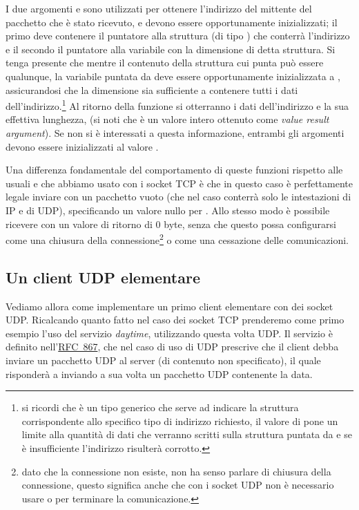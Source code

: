 I due argomenti  e  sono utilizzati per ottenere
l'indirizzo del mittente del pacchetto che è stato ricevuto, e devono essere
opportunamente inizializzati; il primo deve contenere il puntatore alla
struttura (di tipo ) che conterrà l'indirizzo e il secondo il
puntatore alla variabile con la dimensione di detta struttura. Si tenga
presente che mentre il contenuto della struttura  cui punta
 può essere qualunque, la variabile puntata da 
deve essere opportunamente inizializzata a ,
assicurandosi che la dimensione sia sufficiente a contenere tutti i dati
dell'indirizzo.\footnote{si ricordi che  è un tipo generico che
  serve ad indicare la struttura corrispondente allo specifico tipo di
  indirizzo richiesto, il valore di  pone un limite alla
  quantità di dati che verranno scritti sulla struttura puntata da
   e se è insufficiente l'indirizzo risulterà corrotto.}  Al
ritorno della funzione si otterranno i dati dell'indirizzo e la sua effettiva
lunghezza, (si noti che  è un valore intero ottenuto come
\textit{value result argument}).  Se non si è interessati a questa
informazione, entrambi gli argomenti devono essere inizializzati al valore
.

Una differenza fondamentale del comportamento di queste funzioni rispetto alle
usuali  e  che abbiamo usato con i socket TCP è che in
questo caso è perfettamente legale inviare con  un pacchetto
vuoto (che nel caso conterrà solo le intestazioni di IP e di UDP),
specificando un valore nullo per . Allo stesso modo è possibile
ricevere con  un valore di ritorno di 0 byte, senza che questo
possa configurarsi come una chiusura della connessione\footnote{dato che la
  connessione non esiste, non ha senso parlare di chiusura della connessione,
  questo significa anche che con i socket UDP non è necessario usare
   o  per terminare la comunicazione.} o come una
cessazione delle comunicazioni.



\subsection{Un client UDP elementare}
\label{sec:UDP_daytime_client}

Vediamo allora come implementare un primo client elementare con dei socket
UDP.  Ricalcando quanto fatto nel caso dei socket TCP prenderemo come primo
esempio l'uso del servizio \textit{daytime}, utilizzando questa volta UDP. Il
servizio è definito nell'\href{http://www.ietf.org/rfc/rfc0862.txt}{RFC~867},
che nel caso di uso di UDP prescrive che il client debba inviare un pacchetto
UDP al server (di contenuto non specificato), il quale risponderà a inviando a
sua volta un pacchetto UDP contenente la data.

